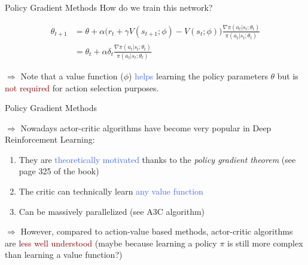 \documentclass{beamer}
\begin{document}
\begin{frame}{Policy Gradient Methods}
	How do we train this network?

	\begin{align*}
		\theta_{t+1} & = \theta + \alpha \Big(r_t+\gamma V(s_{t+1};\phi)-V(s_t;\phi)\Big) \frac{\nabla\pi(a_t|s_t;\theta_t)}{\pi(a_t|s_t;\theta_t)} \\ 
			& = \theta_t + \alpha \delta_t \frac{\nabla\pi(a_t|s_t;\theta_t)}{\pi(a_t|s_t;\theta_t)} 
	\end{align*}

	\bigskip 

	$\Rightarrow$ Note that a value function ($\phi$) \textcolor{RoyalBlue}{helps} learning the policy parameters $\theta$ but is \textcolor{Maroon}{not required}
	for action selection purposes.
\end{frame}


\begin{frame}{Policy Gradient Methods}

	$\Rightarrow$ Nowadays actor-critic algorithms have become \textcolor{skymagenta}{very popular} in Deep Reinforcement Learning:
	\begin{enumerate}
		\item They are \textcolor{RoyalBlue}{theoretically motivated} thanks to the \textit{policy gradient theorem} (see page 325 of the book)
		\item The critic can technically learn \textcolor{RoyalBlue}{any value function}
		\item Can be massively parallelized (see A3C algorithm)
	\end{enumerate}

	\bigskip

	$\Rightarrow$ However, compared to action-value based methods, actor-critic algorithms are \textcolor{Maroon}{less well understood} (maybe because learning a policy $\pi$ is still more complex than learning a value function?) 

\end{frame}
\end{document}
